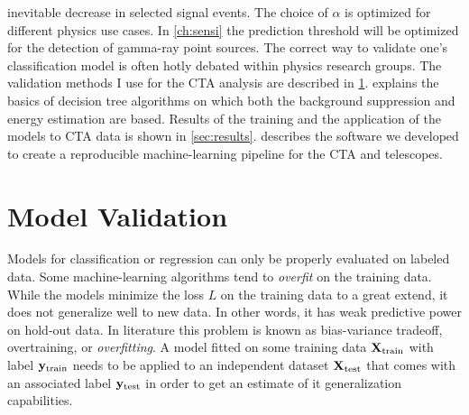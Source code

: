 inevitable decrease in selected signal events. The choice of $\alpha$ is optimized for different physics use cases.
In \cref{ch:sensi} the prediction threshold will be optimized for the detection of gamma-ray point sources. 
The correct way to validate one's classification model is often hotly debated within physics research groups.
The validation methods I use for the CTA analysis are described in \cref{sec:validation}.
 explains the basics of decision tree algorithms on which both the background suppression and energy estimation are based. 
Results of the training and the application of the models to CTA data is shown in \cref{sec:results}.
 describes the software we developed to create a reproducible machine-learning pipeline for the CTA and \fact telescopes. 


\section{Model Validation}
\label{sec:validation}
Models for classification or regression can only be properly evaluated on labeled data.
Some machine-learning algorithms tend to \emph{overfit} on the training data. 
While the models minimize the loss $L$ on the training data to a great extend, it does not generalize well to new data.
In other words, it has weak predictive power on hold-out data.
In literature this problem is known as bias-variance tradeoff, overtraining, or \emph{overfitting}.
A model fitted on some training data $\mathbf{X}_{\text{train}}$ with label $\mathbf{y}_{\text{train}}$ needs to be applied to an independent dataset $\mathbf{X}_{\text{test}}$
that comes with an associated label $\mathbf{y}_{\text{test}}$ in order to get an estimate of it generalization capabilities.


